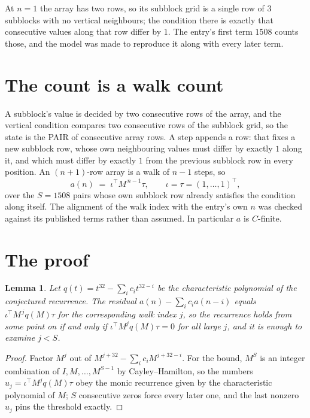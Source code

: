 \documentclass[11pt,a4paper]{article}
\theoremstyle{plain}
\newtheorem{lemma}[theorem]{Lemma}
\theoremstyle{definition}
\begin{document}
At $n=1$ the array has two rows, so its subblock grid is a single row of $3$ subblocks with
no vertical neighbours; the condition there is exactly that consecutive values along that row
differ by $1$. The entry's first term $1508$ counts those, and the model was made to
reproduce it along with every later term.

\section{The count is a walk count}

A subblock's value is decided by two consecutive rows of the array, and the
vertical condition compares two consecutive rows of the subblock grid, so the state is the
PAIR of consecutive array rows. A step appends a row: that fixes a new subblock row, whose own
neighbouring values must differ by exactly $1$ along it, and which must differ by exactly
$1$ from the previous subblock row in every position. An $(n+1)$-row array is a walk of
$n-1$ steps, so
\[
a(n)\;=\;\iota^{\!\top}M^{\,n-1}\tau,\qquad\iota=\tau=(1,\dots,1)^{\!\top},
\]
over the $S=1508$ pairs whose own subblock row already satisfies the condition along itself.
The alignment of the walk index with the entry's own $n$ was checked against its published
terms rather than assumed. In particular $a$ is $C$-finite.

\section{The proof}

\begin{lemma}\label{lem:crit}
Let $q(t)=t^{32}-\sum_i c_it^{32-i}$ be the characteristic polynomial of the
conjectured recurrence. The residual $a(n)-\sum_ic_ia(n-i)$ equals
$\iota^{\!\top}M^{\,j}q(M)\tau$ for the corresponding walk index $j$, so the recurrence
holds from some point on if and only if $\iota^{\!\top}M^{j}q(M)\tau=0$ for all large $j$,
and it is enough to examine $j<S$.
\end{lemma}

\begin{proof}
Factor $M^{j}$ out of $M^{j+32}-\sum_ic_iM^{j+32-i}$. For the bound, $M^{S}$
is an integer combination of $I,M,\dots,M^{S-1}$ by Cayley--Hamilton, so the numbers
$u_j=\iota^{\!\top}M^{j}q(M)\tau$ obey the monic recurrence given by the characteristic
polynomial of $M$; $S$ consecutive zeros force every later one, and the last nonzero $u_j$
pins the threshold exactly.
\end{proof}
\end{document}
